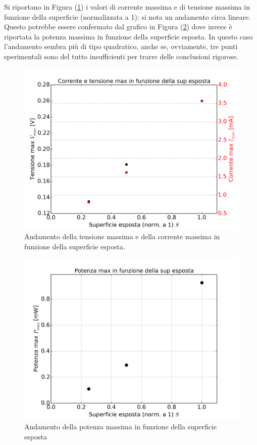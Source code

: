 \documentclass[journal, a4paper]{IEEEtran}
\begin{document}
Si riportano in Figura (\ref{fig:es_9corr_v}) i valori di corrente massima e di tensione massima in funzione della superficie (normalizzata a 1): si nota un andamento circa lineare. Questo potrebbe essere confermato dal grafico in Figura (\ref{fig:es_9pot_sup}) dove invece è riportata la potenza massima in funzione della superficie esposta. In questo caso l'andamento sembra più di tipo quadratico, anche se, ovviamente, tre punti sperimentali sono del tutto insufficienti per trarre delle conclusioni rigorose. 

\begin{figure}
\centering
\includegraphics[width=0.9\linewidth]{./es_9corr_v}
\caption{Andamento della tensione massima e della corrente massima in funzione della superficie esposta.}
\label{fig:es_9corr_v}
\end{figure}

\begin{figure}
\centering
\includegraphics[width=0.9\linewidth]{./es_9pot_sup}
\caption{Andamento della potenza massima in funzione della superficie esposta}
\label{fig:es_9pot_sup}
\end{figure}
\end{document}
